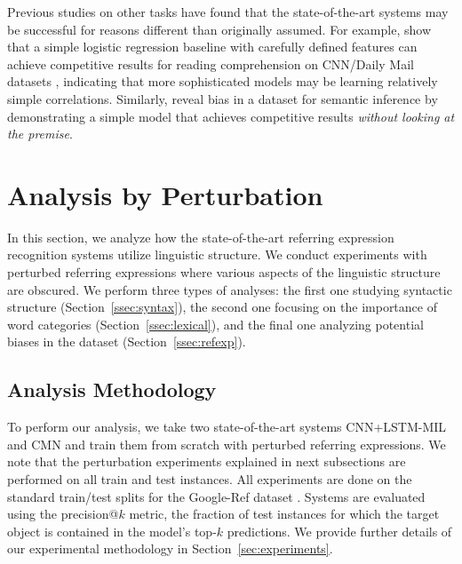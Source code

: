 \documentclass[11pt,a4paper]{article}
\begin{document}
Previous studies on other tasks have found that the state-of-the-art systems may be successful for reasons different than originally assumed. For example, \citet{chen2016} show that a simple logistic regression baseline with carefully defined features can achieve competitive results for reading comprehension on CNN/Daily Mail datasets \cite{hermann2015teaching}, indicating that more sophisticated models may be learning relatively simple correlations.
Similarly, \citet{gururangan2018annotation} reveal bias in a dataset for semantic inference by demonstrating a simple model that achieves competitive results \textit{without looking at the premise}.
%
\figurethree
\vspace{-5pt}
\section{Analysis by Perturbation}\label{sec:analysis}
\vspace{-5pt}
In this section, we analyze how the state-of-the-art referring expression recognition systems utilize linguistic structure.
We conduct experiments with perturbed referring expressions where various aspects of the linguistic structure are obscured.
We perform three types of analyses: the first one studying syntactic structure (Section~\ref{ssec:syntax}), the second one focusing on the importance of word categories (Section~\ref{ssec:lexical}), and the final one analyzing potential biases in the dataset (Section~\ref{ssec:refexp}).

\subsection{Analysis Methodology}\label{ssec:analysis}%
To perform our analysis,
we take two state-of-the-art systems CNN+LSTM-MIL \cite{nagaraja16refexp} and CMN \cite{hu2017modeling} 
and train them from scratch with perturbed referring expressions.
We note that the perturbation experiments explained in next subsections are performed on all train and test instances.
All experiments are done on the standard train/test splits for the Google-Ref dataset \cite{mao2016generation}. Systems are evaluated using the precision@$k$ metric, the fraction of test instances for which the target object is contained in the model's top-$k$ predictions.
We provide further details of our experimental methodology in Section~\ref{sec:experiments}. 
\end{document}
